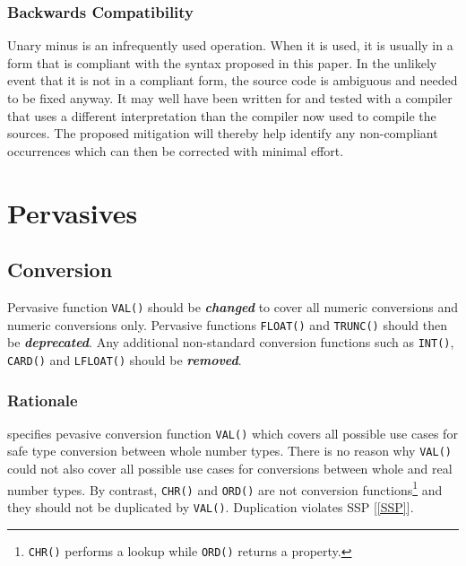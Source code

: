 \documentclass[10pt,a4paper]{article}
\renewcommand{\emph}[1]{\textbf{\textit{#1}}}
\begin{document}
\subsubsection{Backwards Compatibility}

Unary minus is an infrequently used operation. When it is used, it is usually
in a form that is compliant with the syntax proposed in this paper. In the
unlikely event that it is not in a compliant form, the source code is ambiguous
and needed to be fixed anyway. It may well have been written for and tested
with a compiler that uses a different interpretation than the compiler now
used to compile the sources. The proposed mitigation will thereby help
identify any non-compliant occurrences which can then be corrected with
minimal effort.


\section{Pervasives}

\subsection{Conversion}

Pervasive function \verb|VAL()| should be \emph{changed}
to cover all numeric conversions and numeric conversions only.
Pervasive functions \verb|FLOAT()| and \verb|TRUNC()| should then be
\emph{deprecated}. Any additional non-standard conversion functions such as
\verb|INT()|, \verb|CARD()| and \verb|LFLOAT()| should be \emph{removed}.

\subsubsection{Rationale}

\cite[p.150]{Wirth88} specifies pevasive conversion function \verb|VAL()|
which covers all possible use cases for safe type conversion between whole
number types. There is no reason why \verb|VAL()| could not also cover all
possible use cases for conversions between whole and real number
types. By contrast, \texttt{CHR()} and \texttt{ORD()} are not
conversion functions\footnote{\texttt{CHR()} performs a lookup while
\texttt{ORD()} returns a property.} and they should not be duplicated by
\verb|VAL()|. Duplication violates SSP [\ref{SSP}].
 
\end{document}
